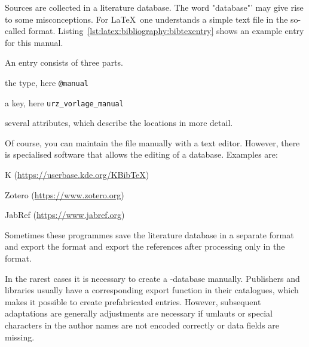Sources are collected in a literature database. The word
"database"' may give rise to some misconceptions. For \LaTeX\ one understands
a simple text file in the so-called  format.
Listing~\ref{lst:latex:bibliography:bibtexentry} shows an example entry for this
manual.



An entry consists of three parts.
%
\begin{compactenum}
\item the type, here \texttt{@manual}
\item a key, here \texttt{urz\_vorlage\_manual}
\item several attributes, which describe the locations in more detail.
\end{compactenum}

Of course, you can maintain the file manually with a text editor. However,
there is specialised software that allows the editing of a 
database. Examples are:
%
\begin{compactitem}
\item K (\url{https://userbase.kde.org/KBibTeX})
\item Zotero (\url{https://www.zotero.org})
\item JabRef (\url{https://www.jabref.org})
\end{compactitem}
%
Sometimes these programmes save the literature database in a separate format
and export the format and export the references after processing only in the
 format.

In the rarest cases it is necessary to create a -database
manually. Publishers and libraries usually have a corresponding export function
in their catalogues, which makes it possible to create prefabricated 
entries. However, subsequent adaptations are generally adjustments are
necessary if umlauts or special characters in the author names are not encoded
correctly or data fields are missing. 
